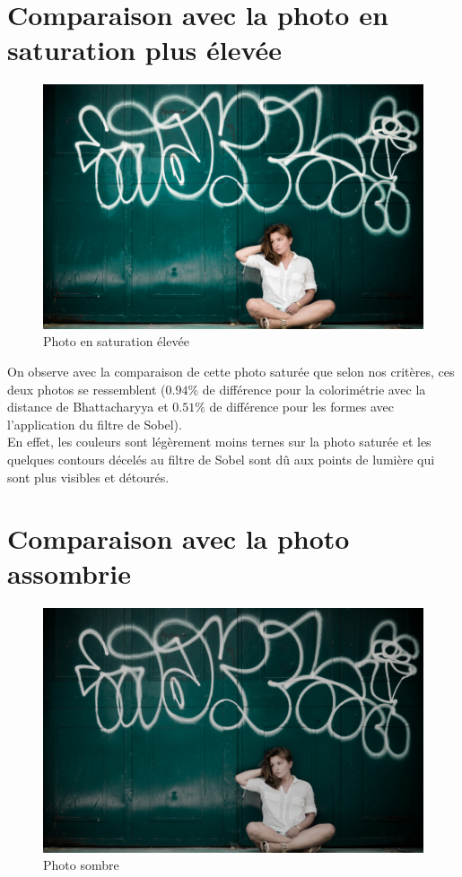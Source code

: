 \documentclass[]{article}
\begin{document}
\newpage

\section{Comparaison avec la photo en saturation plus
élevée}\label{comparaison-avec-la-photo-en-saturation-plus-uxe9levuxe9e}

\begin{figure}[htbp]
\centering
\includegraphics{photos/saturate.jpg}
\caption{Photo en saturation élevée}
\end{figure}

On observe avec la comparaison de cette photo saturée que selon nos
critères, ces deux photos se ressemblent ($0.94\%$ de différence pour la
colorimétrie avec la distance de Bhattacharyya et $0.51\%$ de différence
pour les formes avec l'application du filtre de Sobel).\\En effet, les
couleurs sont légèrement moins ternes sur la photo saturée et les
quelques contours décelés au filtre de Sobel sont dû aux points de
lumière qui sont plus visibles et détourés.

\newpage

\section{Comparaison avec la photo
assombrie}\label{comparaison-avec-la-photo-assombrie}

\begin{figure}[htbp]
\centering
\includegraphics{photos/sombre.jpg}
\caption{Photo sombre}
\end{figure}
\end{document}
